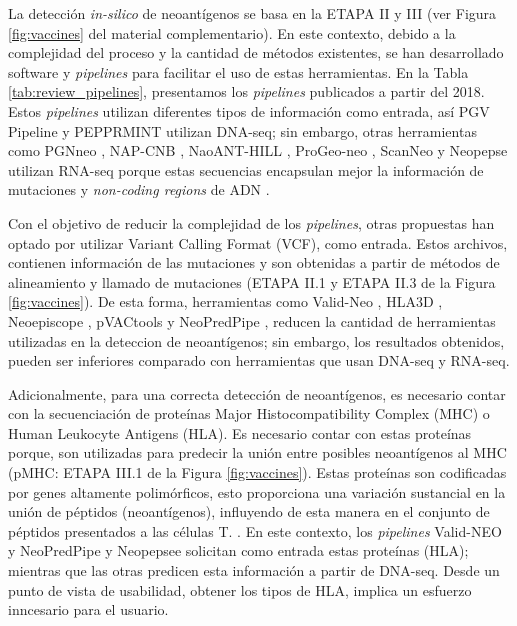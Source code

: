 \documentclass[a4paper,11pt]{article}
\begin{document}
	
La detección \textit{in-silico} de neoantígenos se basa en la ETAPA II y III (ver Figura \ref{fig:vaccines} del material complementario). En este contexto, debido a la complejidad del proceso y la cantidad de métodos existentes, se han desarrollado software y \textit{pipelines} para facilitar el uso de estas herramientas. En la Tabla \ref{tab:review_pipelines}, presentamos los \textit{pipelines} publicados a partir del 2018. Estos \textit{pipelines} utilizan diferentes tipos de información como entrada, así PGV Pipeline \cite{rubinsteyn2018computational} y PEPPRMINT \cite{zhou2023prioritizing} utilizan DNA-seq; sin embargo, otras herramientas como PGNneo \cite{tan2023pgnneo}, NAP-CNB \cite{wert2021predicting}, NaoANT-HILL \cite{coelho2020neoant}, ProGeo-neo \cite{li2020progeo}, ScanNeo \cite{wang2019scanneo} y Neopepse \cite{kim2018neopepsee} utilizan RNA-seq porque estas secuencias encapsulan mejor la información de mutaciones y \textit{non-coding regions} de ADN \cite{tan2023pgnneo}. 

Con el objetivo de reducir la complejidad de los \textit{pipelines}, otras propuestas han optado por utilizar Variant Calling Format (VCF), como entrada. Estos archivos, contienen información de las mutaciones y son obtenidas a partir de métodos de alineamiento y llamado de mutaciones (ETAPA II.1 y ETAPA II.3 de la Figura \ref{fig:vaccines}). De esta forma, herramientas como Valid-Neo \cite{terai2022valid}, HLA3D \cite{li2022hla3d}, Neoepiscope \cite{wood2020neoepiscope} , pVACtools \cite{hundal2020pvactools} y NeoPredPipe \cite{schenck2019neopredpipe}, reducen la cantidad de herramientas utilizadas en la deteccion de neoantígenos; sin embargo, los resultados obtenidos, pueden ser inferiores comparado con herramientas que usan DNA-seq y RNA-seq. 

Adicionalmente, para una correcta detección de neoantígenos, es necesario contar con la secuenciación de proteínas Major Histocompatibility Complex (MHC) o Human Leukocyte Antigens (HLA). Es necesario contar con estas proteínas porque, son utilizadas para predecir la unión entre posibles neoantígenos al MHC (pMHC: ETAPA III.1 de la Figura \ref{fig:vaccines}). Estas proteínas son codificadas por genes altamente polimórficos, esto proporciona una variación sustancial en la unión de péptidos (neoantígenos), influyendo de esta manera en el conjunto de péptidos presentados a las células T. \cite{abualrous2021major}. En este contexto,  los \textit{pipelines} Valid-NEO \cite{terai2022valid}  y NeoPredPipe \cite{schenck2019neopredpipe} y Neopepsee \cite{kim2018neopepsee} solicitan como entrada estas proteínas (HLA); mientras que las otras predicen esta información a partir de DNA-seq. Desde un punto de vista de usabilidad, obtener los tipos de HLA, implica un esfuerzo inncesario para el usuario.
\end{document}
